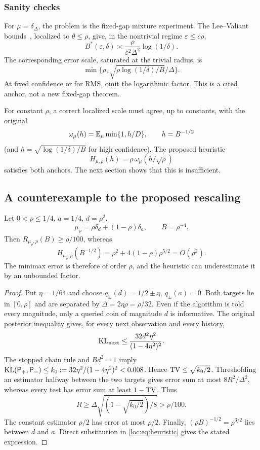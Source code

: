 \subsubsection{Sanity checks}
For $\mu=\delta_\Delta$, the problem is the fixed-gap mixture experiment. The Lee--Valiant bounds~\cite{leevaliant}, localized to $\theta\le\rho$, give, in the nontrivial regime $\varepsilon\le c\rho$,
\begin{equation}\label{loc:eq:lvanchor}
 B^*(\varepsilon,\delta)\asymp
 \frac{\rho}{\varepsilon^2\Delta^2}\log(1/\delta).
\end{equation}
The corresponding error scale, saturated at the trivial radius, is
\[\min\{\rho,\sqrt{\rho\log(1/\delta)/B}/\Delta\}.\]
At fixed confidence or for RMS, omit the logarithmic factor. This is a cited anchor, not a new fixed-gap theorem.

For constant $\rho$, a correct localized scale must agree, up to constants, with the original
\[
 \omega_\mu(h)=\mathbb E_\mu\min\{1,h/D\},\qquad h=B^{-1/2}
\]
(and $h=\sqrt{\log(1/\delta)/B}$ for high confidence). The proposed heuristic
\begin{equation}\label{loc:eq:heuristic}
 H_{\mu,\rho}(h)=\rho\,\omega_\mu(h/\sqrt\rho)
\end{equation}
satisfies both anchors. The next section shows that this is insufficient.

\subsection{A counterexample to the proposed rescaling}
\begin{theorem}\label{loc:thm:counter}
Let $0<\rho\le1/4$, $a=1/4$, $d=\rho^2$,
\[
 \mu_\rho=\rho\delta_d+(1-\rho)\delta_a,\qquad B=\rho^{-4}.
\]
Then $R_{\mu_\rho,\rho}(B)\ge\rho/100$, whereas
\[
 H_{\mu_\rho,\rho}(B^{-1/2})
 =\rho^2+4(1-\rho)\rho^{5/2}=O(\rho^2).
\]
The minimax error is therefore of order $\rho$, and the heuristic can underestimate it by an unbounded factor.
\end{theorem}
\begin{proof}
Put $\eta=1/64$ and choose $q_\pm(d)=1/2\pm\eta$, $q_\pm(a)=0$. Both targets lie in $[0,\rho]$ and are separated by $\Delta=2\eta\rho=\rho/32$. Even if the algorithm is told every magnitude, only a queried coin of magnitude $d$ is informative. The original posterior inequality gives, for every next observation and every history,
\[
 \operatorname{KL}_{\rm next}\le\frac{32d^2\eta^2}{(1-4\eta^2)^2}.
\]
The stopped chain rule and $Bd^2=1$ imply $\operatorname{KL}(\mathsf P_+,\mathsf P_-)\le k_0:=32\eta^2/(1-4\eta^2)^2<0.008$. Hence $\operatorname{TV}\le\sqrt{k_0/2}$. Thresholding an estimator halfway between the two targets gives error sum at most $8R^2/\Delta^2$, whereas every test has error sum at least $1-\operatorname{TV}$. Thus
\[
 R\ge\Delta\sqrt{(1-\sqrt{k_0/2})/8}>\rho/100.
\]
The constant estimator $\rho/2$ has error at most $\rho/2$. Finally, $(\rho B)^{-1/2}=\rho^{3/2}$ lies between $d$ and $a$. Direct substitution in \eqref{loc:eq:heuristic} gives the stated expression.
\end{proof}

